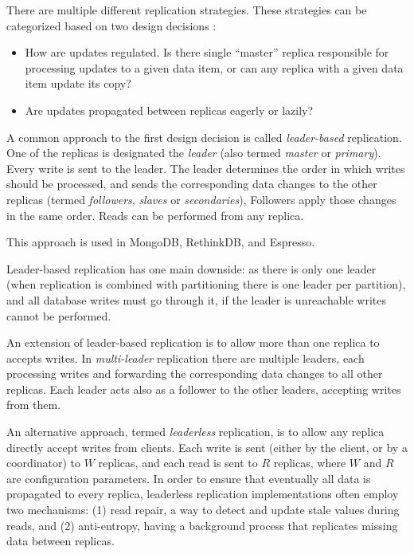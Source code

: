 There are multiple different replication strategies.
These strategies can be categorized based on two design decisions \cite{gray:replication}:
\begin{itemize}
  \item How are updates regulated. Is there single ``master'' replica responsible for processing updates to a given data item,
  or can any replica with a given data item update its copy?
  \item Are updates propagated between replicas eagerly or lazily?
\end{itemize}

\bigskip
\noindent
A common approach to the first design decision is called \textit{leader-based} replication.
One of the replicas is designated the \textit{leader} (also termed \textit{master} or \textit{primary}).
Every write is sent to the leader.
The leader determines the order in which writes should be processed,
and sends the corresponding data changes to the other replicas
(termed \textit{followers}, \textit{slaves} or \textit{secondaries}),
Followers apply those changes in the same order.
Reads can be performed from any replica.

This approach is used in MongoDB, RethinkDB, and Espresso.

Leader-based replication has one main downside:
as there is only one leader (when replication is combined with partitioning there is one leader per partition),
and all database writes must go through it, if the leader is unreachable writes cannot be performed.

An extension of leader-based replication is to allow more than one replica to accepts writes.
In \textit{multi-leader} replication there are multiple leaders,
each processing writes and forwarding the corresponding data changes to all other replicas.
Each leader acts also as a follower to the other leaders, accepting writes from them.

An alternative approach, termed \textit{leaderless} replication,
is to allow any replica directly accept writes from clients.
Each write is sent (either by the client, or by a coordinator) to $W$ replicas, and each read is sent to $R$ replicas,
where $W$ and $R$ are configuration parameters.
In order to ensure that eventually all data is propagated to every replica,
leaderless replication implementations often employ two mechanisms:
(1) read repair, a way to detect and update stale values during reads,
and (2) anti-entropy, having a background process that replicates missing data between replicas.

